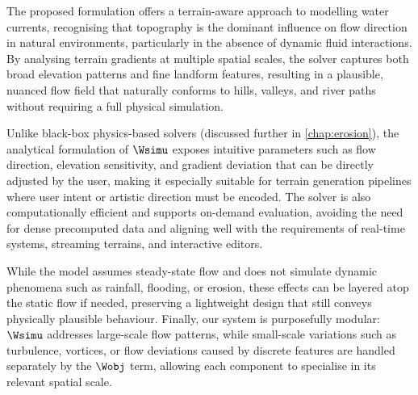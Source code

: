 The proposed formulation offers a terrain-aware approach to modelling water currents, recognising that topography is the dominant influence on flow direction in natural environments, particularly in the absence of dynamic fluid interactions. By analysing terrain gradients at multiple spatial scales, the solver captures both broad elevation patterns and fine landform features, resulting in a plausible, nuanced flow field that naturally conforms to hills, valleys, and river paths without requiring a full physical simulation.

Unlike black-box physics-based solvers (discussed further in \cref{chap:erosion}), the analytical formulation of $\Wsimu$ exposes intuitive parameters such as flow direction, elevation sensitivity, and gradient deviation that can be directly adjusted by the user, making it especially suitable for terrain generation pipelines where user intent or artistic direction must be encoded. The solver is also computationally efficient and supports on-demand evaluation, avoiding the need for dense precomputed data and aligning well with the requirements of real-time systems, streaming terrains, and interactive editors.

While the model assumes steady-state flow and does not simulate dynamic phenomena such as rainfall, flooding, or erosion, these effects can be layered atop the static flow if needed, preserving a lightweight design that still conveys physically plausible behaviour. Finally, our system is purposefully modular: $\Wsimu$ addresses large-scale flow patterns, while small-scale variations such as turbulence, vortices, or flow deviations caused by discrete features are handled separately by the $\Wobj$ term, allowing each component to specialise in its relevant spatial scale.



